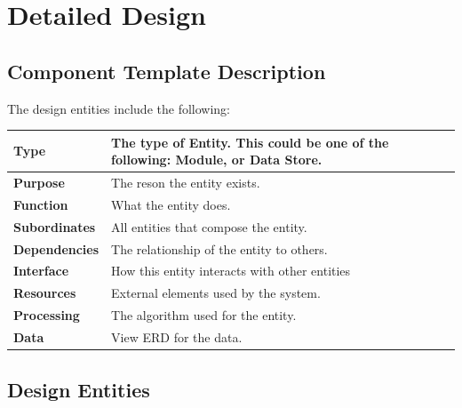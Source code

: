 \documentclass{article}
\begin{document}
\newpage

\section{Detailed Design}

\subsection{Component Template Description}

The design entities include the following:

\begin{tabular}{ | l |  p{13.3cm} |}
\hline
\textbf{Type} & The type of Entity. This could be one of the following: Module, or Data Store. \\ \hline
\textbf{Purpose} & The reson the entity exists.  \\ \hline
\textbf{Function} & What the entity does. \\ \hline
\textbf{Subordinates} & All entities that compose the entity. \\ \hline
\textbf{Dependencies} & The relationship of the entity to others. \\ \hline
\textbf{Interface} & How this entity interacts with other entities \\ \hline
\textbf{Resources} & External elements used by the system. \\ \hline
\textbf{Processing} & The algorithm used for the entity. \\ \hline
\textbf{Data} & View ERD for the data. \\ \hline
\end{tabular}

\subsection{Design Entities}
\end{document}
